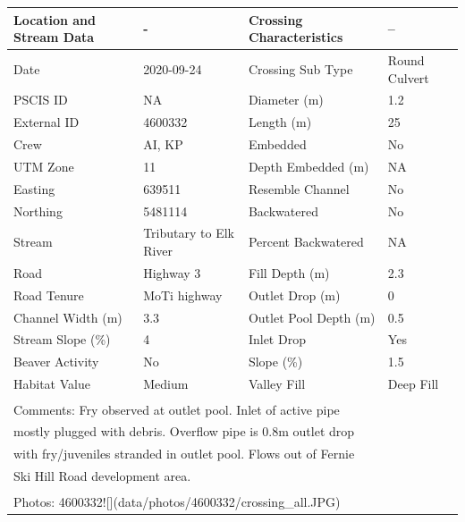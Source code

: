 \documentclass[
]{book}
\begin{document}
\begin{tabular}{l|l|l|l}
\hline
Location and Stream Data & - & Crossing Characteristics & --\\
\hline
Date & 2020-09-24 & Crossing Sub Type & Round Culvert\\
\hline
PSCIS ID & NA & Diameter (m) & 1.2\\
\hline
External ID & 4600332 & Length (m) & 25\\
\hline
Crew & AI, KP & Embedded & No\\
\hline
UTM Zone & 11 & Depth Embedded (m) & NA\\
\hline
Easting & 639511 & Resemble Channel & No\\
\hline
Northing & 5481114 & Backwatered & No\\
\hline
Stream & Tributary to Elk River & Percent Backwatered & NA\\
\hline
Road & Highway 3 & Fill Depth (m) & 2.3\\
\hline
Road Tenure & MoTi highway & Outlet Drop (m) & 0\\
\hline
Channel Width (m) & 3.3 & Outlet Pool Depth (m) & 0.5\\
\hline
Stream Slope (\%) & 4 & Inlet Drop & Yes\\
\hline
Beaver Activity & No & Slope (\%) & 1.5\\
\hline
Habitat Value & Medium & Valley Fill & Deep Fill\\
\hline
\multicolumn{4}{l}{\textsuperscript{} Comments: Fry observed at outlet pool.  Inlet of active pipe}\\
\multicolumn{4}{l}{mostly plugged with debris. Overflow pipe is 0.8m outlet drop}\\
\multicolumn{4}{l}{with fry/juveniles stranded in outlet pool.  Flows out of Fernie}\\
\multicolumn{4}{l}{Ski Hill Road development area.}\\
\multicolumn{4}{l}{\textsuperscript{} Photos: 4600332![](data/photos/4600332/crossing\_all.JPG)}\\
\end{tabular}
\end{document}
